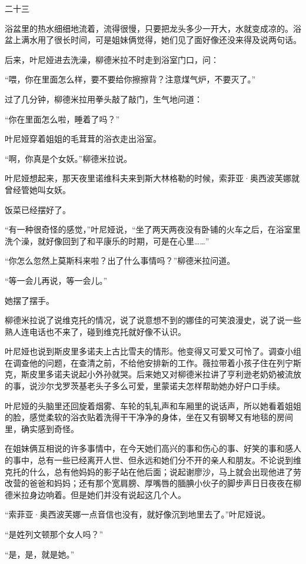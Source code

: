 二十三

浴盆里的热水细细地流着，流得很慢，只要把龙头多少一开大，水就变成凉的。浴盆上满水用了很长时间，可是姐妹俩觉得，她们见了面好像还没来得及说两句话。

后来，叶尼娅进去洗澡，柳德米拉不时走到浴室门口，问：

“喂，你在里面怎么样，要不要给你擦擦背？注意煤气炉，不要灭了。”

过了几分钟，柳德米拉用拳头敲了敲门，生气地问道：

“你在里面怎么啦，睡着了吗？”

叶尼娅穿着姐姐的毛茸茸的浴衣走出浴室。

“啊，你真是个女妖。”柳德米拉说。

叶尼娅想起来，那天夜里诺维科夫来到斯大林格勒的时候，索菲亚·奥西波芙娜就曾经管她叫女妖。

饭菜已经摆好了。

“有一种很奇怪的感觉，”叶尼娅说，“坐了两天两夜没有卧铺的火车之后，在浴室里洗个澡，就好像回到了和平康乐的时期，可是在心里……”

“你怎么忽然上莫斯科来啦？出了什么事情吗？”柳德米拉问道。

“等一会儿再说，等一会儿。”

她摆了摆手。

柳德米拉说了说维克托的情况，说了说意想不到的娜佳的可笑浪漫史，说了说一些熟人连电话也不来了，碰到维克托就好像不认识。

叶尼娅也说到斯皮里多诺夫上古比雪夫的情形。他变得又可爱又可怜了。调查小组在调查他的问题，在查清之前，不给他安排新的工作。薇拉带着小孩子住在列宁斯克，斯皮里多诺夫说起小外孙就哭。后来她又对柳德米拉讲了亨利逊老奶奶被流放的事，说沙尔戈罗茨基老头子多么可爱，里蒙诺夫怎样帮助她办好户口手续。

叶尼娅的头脑里还回旋着烟雾、车轮的轧轧声和车厢里的说话声，所以她看着姐姐的脸，感觉柔软的浴衣贴着洗得干干净净的身体，坐在又有钢琴又有地毯的房间里，确实感到奇怪。

在姐妹俩互相说的许多事情中，在今天她们高兴的事和伤心的事、好笑的事和感人的事中，总有一些已经离开人世、但永远和她们分不开的亲人和朋友。不论说到维克托的什么，总有他妈妈的影子站在他后面；说起谢廖沙，马上就会出现他进了劳改营的爸爸和妈妈；还有那个宽肩膀、厚嘴唇的腼腆小伙子的脚步声日日夜夜在柳德米拉身边响着。但是她们并没有说起这几个人。

“索菲亚·奥西波芙娜一点音信也没有，就好像沉到地里去了。”叶尼娅说。

“是姓列文顿那个女人吗？”

“是，是，就是她。”

